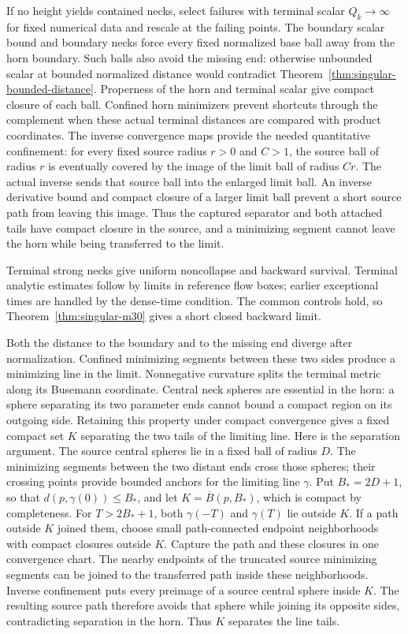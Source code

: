If no height yields contained necks, select failures with terminal scalar
$Q_k\to\infty$ for fixed numerical data and rescale at the failing
points. The boundary scalar bound and boundary necks force every fixed
normalized base ball away from the horn boundary. Such balls also avoid
the missing end: otherwise unbounded scalar at bounded normalized distance
would contradict Theorem~\ref{thm:singular-bounded-distance}. Properness
of the horn and terminal scalar give compact closure of each ball.
Confined horn minimizers prevent shortcuts through the complement when
these actual terminal distances are compared with product coordinates. The
inverse convergence maps provide the needed quantitative confinement: for
every fixed source radius $r>0$ and $C>1$, the source ball of radius $r$
is eventually covered by the image of the limit ball of radius $Cr$.
The actual inverse sends that source ball into the enlarged limit ball.
An inverse derivative bound and compact closure of a larger limit ball
prevent a short source path from leaving this image. Thus the captured
separator and both attached tails have compact
closure in the source, and a minimizing segment cannot leave the horn while
being transferred to the limit.

Terminal strong necks give uniform noncollapse and backward survival.
Terminal analytic estimates follow by limits in reference flow boxes;
earlier exceptional times are handled by the dense-time condition.
The common controls hold, so Theorem~\ref{thm:singular-m30} gives a short
closed backward limit.

Both the distance to the boundary and to the missing end diverge after
normalization. Confined minimizing segments between these two sides
produce a minimizing line in the limit. Nonnegative curvature splits the
terminal metric along its Busemann coordinate. Central neck spheres are
essential in the horn: a sphere separating its two parameter ends cannot
bound a compact region on its outgoing side. Retaining this property
under compact convergence gives a fixed compact set $K$ separating the
two tails of the limiting line. Here is the separation argument. The source
central spheres lie in a fixed ball of radius $D$. The minimizing segments
between the two distant ends cross those spheres; their crossing points
provide bounded anchors for the limiting line $\gamma$. Put $B_*=2D+1$,
so that $d(p,\gamma(0))\leq B_*$, and let
$K=\overline B(p,B_*)$, which is compact by completeness. For
$T>2B_*+1$, both $\gamma(-T)$ and $\gamma(T)$ lie outside $K$.
If a path outside $K$ joined them, choose small path-connected endpoint
neighborhoods with compact closures outside $K$. Capture the path and these
closures in one convergence chart. The nearby endpoints of the truncated
source minimizing segments can be joined to the transferred path inside
these neighborhoods. Inverse confinement puts every preimage of a source
central sphere inside $K$. The resulting source path therefore avoids that
sphere while joining its opposite sides, contradicting separation in the
horn. Thus $K$ separates the line tails.

